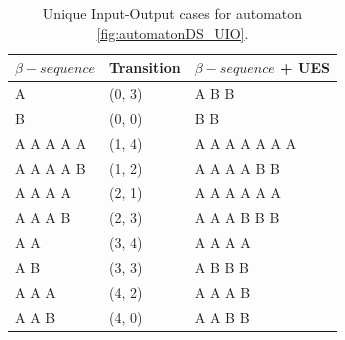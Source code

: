 \begin{table}
\begin{center}
\begin{tabular}{| l | l| l|}

\hline

$\beta-sequence$ & Transition & $\beta-sequence$ + UES \\ \hline

A & (0, 3) & A B B\\ \hline
B & (0, 0) & B B\\ \hline
A A A A A & (1, 4) & A A A A A A A\\ \hline
A A A A B & (1, 2) & A A A A B B \\ \hline
A A A A & (2, 1) & A A A A A A\\ \hline
A A A B & (2, 3) & A A A B B B\\ \hline
A A & (3, 4) & A A A A\\ \hline
A B & (3, 3) & A B B B\\ \hline
A A A & (4, 2) & A A A B \\ \hline
A A B & (4, 0) & A A B B \\
\hline
\end{tabular}
\end{center}
\caption{Unique Input-Output cases for automaton \ref{fig:automatonDS_UIO}.\cite{inpe10}}
\label{tableUES_2}
\end{table}



